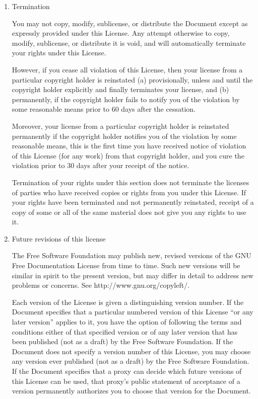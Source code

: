 \begin{enumerate}
If a section in the Document is Entitled ``Acknowledgements'',
``Dedications'', or ``History'', the requirement (section~4) to Preserve
its Title (section~1) will typically require changing the actual
title.

\item Termination

You may not copy, modify, sublicense, or distribute the Document
except as expressly provided under this License.  Any attempt
otherwise to copy, modify, sublicense, or distribute it is void, and
will automatically terminate your rights under this License.

However, if you cease all violation of this License, then your license
from a particular copyright holder is reinstated (a) provisionally,
unless and until the copyright holder explicitly and finally
terminates your license, and (b) permanently, if the copyright holder
fails to notify you of the violation by some reasonable means prior to
60 days after the cessation.

Moreover, your license from a particular copyright holder is
reinstated permanently if the copyright holder notifies you of the
violation by some reasonable means, this is the first time you have
received notice of violation of this License (for any work) from that
copyright holder, and you cure the violation prior to 30 days after
your receipt of the notice.

Termination of your rights under this section does not terminate the
licenses of parties who have received copies or rights from you under
this License.  If your rights have been terminated and not permanently
reinstated, receipt of a copy of some or all of the same material does
not give you any rights to use it.

\item Future revisions of this license

The Free Software Foundation may publish new, revised versions
of the GNU Free Documentation License from time to time.  Such new
versions will be similar in spirit to the present version, but may
differ in detail to address new problems or concerns.  See
http://www.gnu.org/copyleft/.

Each version of the License is given a distinguishing version number.
If the Document specifies that a particular numbered version of this
License ``or any later version'' applies to it, you have the option of
following the terms and conditions either of that specified version or
of any later version that has been published (not as a draft) by the
Free Software Foundation.  If the Document does not specify a version
number of this License, you may choose any version ever published (not
as a draft) by the Free Software Foundation.  If the Document
specifies that a proxy can decide which future versions of this
License can be used, that proxy's public statement of acceptance of a
version permanently authorizes you to choose that version for the
Document.


\end{enumerate}

